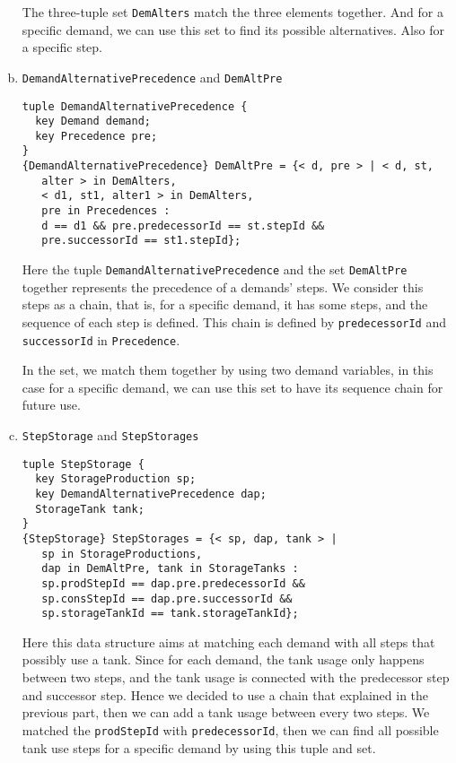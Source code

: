 \documentclass[a4paper, 12pt]{article}
\begin{document}
\begin{enumerate}[a.~]
The three-tuple set \texttt{DemAlters} match the three elements together. And for a specific demand, we can use this set to find its possible alternatives. Also for a specific step. 
\item \texttt{DemandAlternativePrecedence} and \texttt{DemAltPre}
\begin{lstlisting}
tuple DemandAlternativePrecedence {
  key Demand demand;
  key Precedence pre;
}
{DemandAlternativePrecedence} DemAltPre = {< d, pre > | < d, st,
   alter > in DemAlters, 
   < d1, st1, alter1 > in DemAlters, 
   pre in Precedences :
   d == d1 && pre.predecessorId == st.stepId && 
   pre.successorId == st1.stepId};
\end{lstlisting}
Here the tuple \texttt{DemandAlternativePrecedence} and the set \texttt{DemAltPre} together represents the precedence of a demands' steps. We consider this steps as a chain, that is, for a specific demand, it has some steps, and the sequence of each step is defined. This chain is defined by \texttt{predecessorId} and \texttt{successorId} in \texttt{Precedence}. 

In the set, we match them together by using two demand variables, in this case for a specific demand, we can use this set to have its sequence chain for future use.
\item \texttt{StepStorage} and \texttt{StepStorages}
\begin{lstlisting}
tuple StepStorage {
  key StorageProduction sp;
  key DemandAlternativePrecedence dap;
  StorageTank tank;
}
{StepStorage} StepStorages = {< sp, dap, tank > | 
   sp in StorageProductions,
   dap in DemAltPre, tank in StorageTanks :
   sp.prodStepId == dap.pre.predecessorId && 
   sp.consStepId == dap.pre.successorId && 
   sp.storageTankId == tank.storageTankId};
\end{lstlisting} 
Here this data structure aims at matching each demand with all steps that possibly use a tank. Since for each demand, the tank usage only happens between two steps, and the tank usage is connected with the predecessor step and successor step. Hence we decided to use a chain that explained in the previous part, then we can add a tank usage between every two steps. We matched the \texttt{prodStepId} with \texttt{predecessorId}, then we can find all possible tank use steps for a specific demand by using this tuple and set. 


\end{enumerate}
\end{document}
